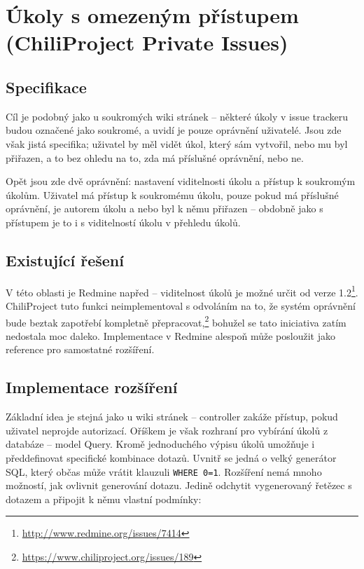 \documentclass[thesis=B,czech]{FITthesis}[2012/05/02]
\begin{document}
\section[Úkoly s omezeným přístupem]{Úkoly s omezeným přístupem (ChiliProject Private Issues)}
\label{sec:private_issues}

\subsection{Specifikace}

Cíl je podobný jako u soukromých wiki stránek -- některé úkoly v issue
trackeru budou označené jako soukromé, a uvidí je pouze oprávnění
uživatelé. Jsou zde však jistá specifika; uživatel by měl vidět úkol,
který sám vytvořil, nebo mu byl přiřazen, a to bez ohledu na to,
zda má příslušné oprávnění, nebo ne.

Opět jsou zde dvě oprávnění: nastavení viditelnosti úkolu a přístup
k soukromým úkolům. Uživatel má přístup k soukromému úkolu, pouze pokud má
příslušné oprávnění, je autorem úkolu a nebo byl k němu přiřazen --
obdobně jako s přístupem je to i s viditelností úkolu v přehledu úkolů.

\subsection{Existující řešení}
\label{sec:private_issues_exist}

V této oblasti je Redmine napřed -- viditelnost úkolů je možné určit od
verze 1.2\footnote{\url{http://www.redmine.org/issues/7414}}.
ChiliProject tuto funkci neimplementoval s odvoláním na to, že systém
oprávnění bude beztak zapotřebí kompletně přepracovat,\footnote{\url{https://www.chiliproject.org/issues/189}}
bohužel se tato iniciativa zatím nedostala moc daleko. Implementace
v Redmine alespoň může posloužit jako reference pro samostatné
rozšíření.

\subsection{Implementace rozšíření}

Základní idea je stejná jako u wiki stránek -- controller zakáže přístup,
pokud uživatel neprojde autorizací. Oříškem je však rozhraní pro
vybírání úkolů z databáze -- model Query. Kromě jednoduchého výpisu
úkolů umožňuje i předdefinovat specifické kombinace dotazů. Uvnitř se
jedná o velký generátor SQL, který občas může vrátit klauzuli
\lstinline!WHERE 0=1!. Rozšíření nemá mnoho možností, jak ovlivnit
generování dotazu. Jedině odchytit vygenerovaný řetězec
s dotazem a připojit k němu vlastní podmínky:
\end{document}

